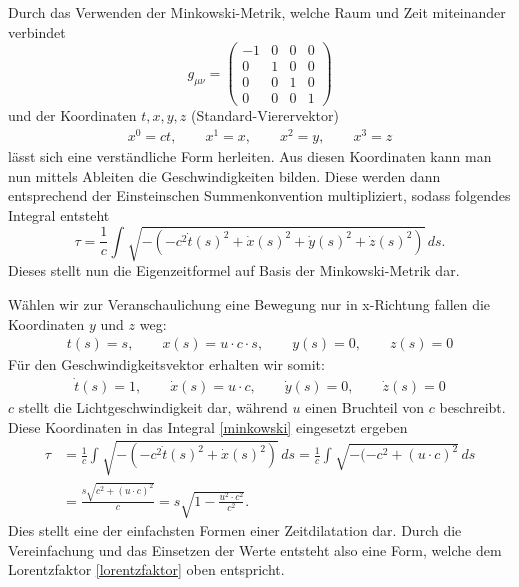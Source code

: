 \begin{refsection}
Durch das Verwenden der Minkowski-Metrik, welche Raum und Zeit miteinander verbindet 
\begin{equation}
    g_{\mu\nu}=
    \begin{pmatrix}
        -1 & 0 & 0 & 0 \\
        0 & 1 & 0 & 0 \\
        0 & 0 & 1 & 0 \\
        0 & 0 & 0 & 1
    \end{pmatrix}
\end{equation}
und der Koordinaten $t, x, y, z$ (Standard-Vierervektor)
\begin{align*}
x^{0}=ct,\qquad x^{1}=x,\qquad x^{2}=y,\qquad x^{3}=z 
\end{align*}
lässt sich eine verständliche Form herleiten.
Aus diesen Koordinaten kann man nun mittels Ableiten die Geschwindigkeiten bilden. Diese werden dann entsprechend der Einsteinschen Summenkonvention multipliziert, sodass folgendes Integral entsteht 
\begin{equation}\label{minkowski}
    \tau
    =
    \frac{1}{c}\int_{}^{}\sqrt{-(-c^2\dot{t}(s)^{2}+\dot{x}(s)^{2}+\dot{y}(s)^{2}+\dot{z}(s)^{2})}\,ds.
\end{equation} 
Dieses stellt nun die Eigenzeitformel auf Basis der Minkowski-Metrik dar.

Wählen wir zur Veranschaulichung eine Bewegung nur in x-Richtung fallen die Koordinaten $y$ und $z$ weg:
\begin{align*}
     t(s)= s,
 	 \qquad x(s)=u\cdot c \cdot s,
     \qquad y(s)=0,
     \qquad z(s)=0 
\end{align*}
Für den Geschwindigkeitsvektor erhalten wir somit:
\begin{align*}
     \dot{t}(s)=1,
     \qquad\dot{x}(s)=u\cdot c,
     \qquad\dot{y}(s)=0,
     \qquad\dot{z}(s)=0
\end{align*}
$c$ stellt die Lichtgeschwindigkeit dar, während $u$ einen Bruchteil von $c$ beschreibt.
Diese Koordinaten in das Integral \ref{minkowski} eingesetzt ergeben
\begin{align*}
\tau
&=
\frac{1}{c}\int_{}^{}\sqrt{-(-c^2\dot{t}(s)^2+\dot{x}(s)^2)}\,ds 
=
\frac{1}{c}\int_{}^{}\sqrt{-(-c^2 +(u\cdot c)^{2}}\,ds\\
&=
\frac{s\sqrt{c^2+(u\cdot c)^{2}}}{c} 
=
s\sqrt{1-\frac{u^2\cdot c^2}{c^2}}.
\end{align*}
Dies stellt eine der einfachsten Formen einer Zeitdilatation dar. Durch die Vereinfachung und das Einsetzen der Werte entsteht also eine Form, welche dem Lorentzfaktor \eqref{lorentzfaktor} oben entspricht.


\end{refsection}
